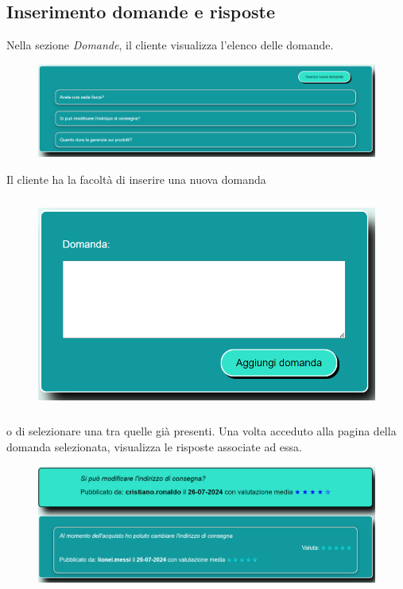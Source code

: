 \documentclass[a4paper, 14pt]{article}
\begin{document}
\begin{flushleft}
			\subsection{Inserimento domande e risposte}
				Nella sezione \textit{Domande}, il cliente visualizza l'elenco delle domande.
				\begin{figure}[H]
					\centering
					\includegraphics[width=\textwidth, frame=2pt]{"screenDomande.png"}	
				\end{figure}
				Il cliente ha la facoltà di inserire una nuova domanda
				\begin{figure}[H]
					\centering
					\includegraphics[height=7cm, frame=2pt]{"screenInserimentoDomanda.png"}	
				\end{figure}
				o di selezionare una tra quelle già presenti. Una volta acceduto alla pagina della domanda selezionata,
				visualizza le risposte associate ad essa.
				\begin{figure}[H]
					\centering
					\includegraphics[width=\textwidth, frame=2pt]{"screenDomanda.png"}	

\end{figure}
\end{flushleft}
\end{document}
